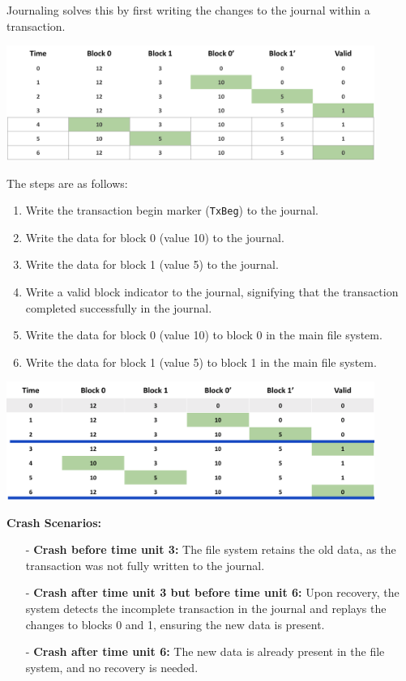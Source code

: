\documentclass[../../compsys.tex]{subfiles}
\begin{document}
Journaling solves this by first writing the changes to the journal within a transaction.

\begin{center}
    \includegraphics[width=0.9\textwidth]{chapters/L7/images/journal-example2.png}
\end{center}

The steps are as follows:

\begin{enumerate}
    \item Write the transaction begin marker (\texttt{TxBeg}) to the journal.
    \item Write the data for block 0 (value 10) to the journal.
    \item Write the data for block 1 (value 5) to the journal.
    \item Write a valid block indicator to the journal, signifying that the transaction completed successfully in the journal.
    \item Write the data for block 0 (value 10) to block 0 in the main file system.
    \item Write the data for block 1 (value 5) to block 1 in the main file system.
\end{enumerate}

\begin{center}
    \includegraphics[width=0.9\textwidth]{chapters/L7/images/journal-example3.png}
\end{center}
\newpage
\textbf{Crash Scenarios:}

\begin{itemize}
    \item [-] \textbf{Crash before time unit 3:} The file system retains the old data, as the transaction was not fully written to the journal.
    \item [-] \textbf{Crash after time unit 3 but before time unit 6:} Upon recovery, the system detects the incomplete transaction in the journal and replays the changes to blocks 0 and 1, ensuring the new data is present.
    \item [-] \textbf{Crash after time unit 6:} The new data is already present in the file system, and no recovery is needed.
\end{itemize}
\end{document}
